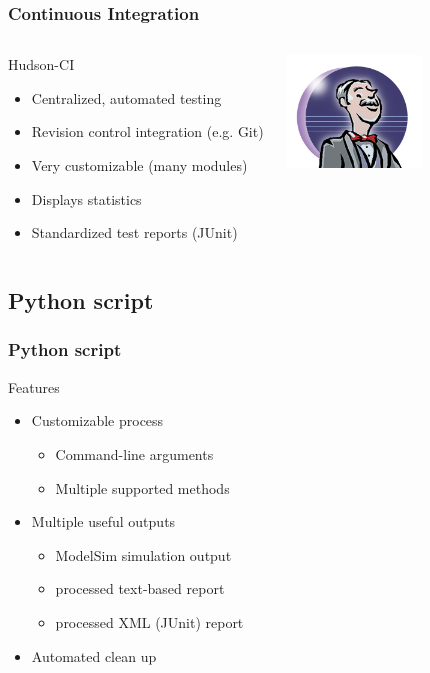 \documentclass[british,10pt]{beamer}
\begin{document}
\begin{frame}\frametitle{Continuous Integration}
\begin{columns}
\begin{column}{0.6\textwidth}
Hudson-CI
\begin{itemize}
\item Centralized, automated testing
\item Revision control integration (e.g. Git)
\item Very customizable (many modules)
\item Displays statistics
\item Standardized test reports (JUnit)
\end{itemize}
\end{column}
\includegraphics[width=0.6\textwidth]{images/hudson.png}
\end{columns}
\end{frame}

\subsection{Python script}

\begin{frame}\frametitle{Python script}
Features
\begin{itemize}
\item Customizable process
\begin{itemize}
\item Command-line arguments
\item Multiple supported methods
\end{itemize}
\item Multiple useful outputs
\begin{itemize}
\item ModelSim simulation output
\item processed text-based report
\item processed XML (JUnit) report
\end{itemize}
\item Automated clean up
\end{itemize}
\end{frame}
\end{document}
